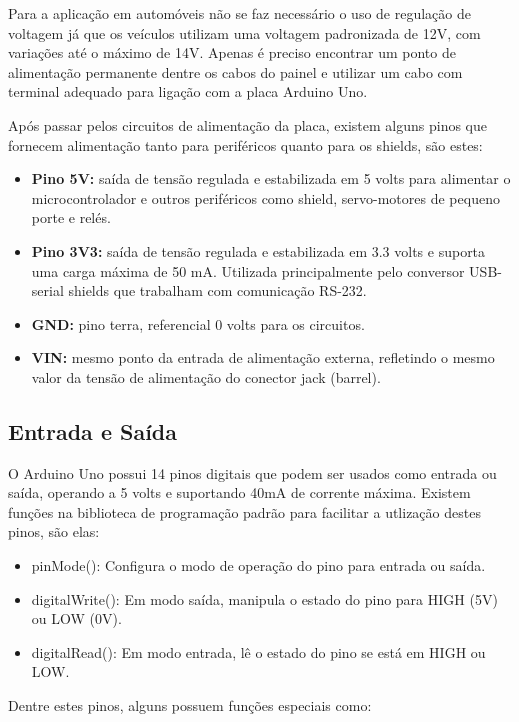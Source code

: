 Para a aplicação em automóveis não se faz necessário o uso de regulação de voltagem já que os veículos utilizam uma voltagem padronizada de 12V, com variações até o máximo de 14V. Apenas é preciso encontrar um ponto de alimentação permanente dentre os cabos do painel e utilizar um cabo com terminal adequado para ligação com a placa Arduino Uno.

Após passar pelos circuitos de alimentação da placa, existem alguns pinos que fornecem alimentação tanto para periféricos quanto para os shields, são estes:

\begin{itemize}
	\item \textbf{Pino 5V:} saída de tensão regulada e estabilizada em 5 volts para alimentar o microcontrolador e outros periféricos como shield, servo-motores de pequeno porte e relés.
	\item \textbf{Pino 3V3:} saída de tensão regulada e estabilizada em 3.3 volts e suporta uma carga máxima de 50 mA. Utilizada principalmente pelo conversor USB-serial shields que trabalham com comunicação RS-232.
	\item \textbf{GND:} pino terra, referencial 0 volts para os circuitos.
	\item \textbf{VIN:} mesmo ponto da entrada de alimentação externa, refletindo o mesmo valor da tensão de alimentação do conector jack (barrel).
\end{itemize}

\subsection{Entrada e Saída}

O Arduino Uno possui 14 pinos digitais que podem ser usados como entrada ou saída, operando a 5 volts e suportando 40mA de corrente máxima. Existem funções na biblioteca de programação padrão para facilitar a utlização destes pinos, são elas:

\begin{itemize}
	\item pinMode(): Configura o modo de operação do pino para entrada ou saída.
	\item digitalWrite(): Em modo saída, manipula o estado do pino para HIGH (5V) ou LOW (0V).
	\item digitalRead(): Em modo entrada, lê o estado do pino se está em HIGH ou LOW.
\end{itemize}

Dentre estes pinos, alguns possuem funções especiais como:

